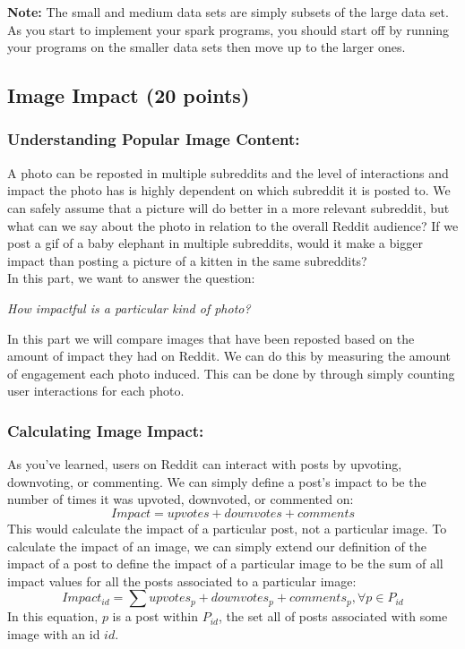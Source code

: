 \documentclass{article}
\begin{document}
\noindent \textbf{Note:}  The small and medium data sets are simply subsets of the large data set. As you start to implement your spark programs, you should start off by running your programs on the smaller data sets then move up to the larger ones. 


\subsection{Image Impact (20 points)}
\subsubsection*{Understanding Popular Image Content:}
A photo can be reposted in multiple subreddits and the level of interactions and impact the photo has is highly dependent on which subreddit it is posted to. We can safely assume that a picture will do better in a more relevant subreddit, but what can we say about the photo in relation to the overall Reddit audience? If we post a gif of a baby elephant in multiple subreddits, would it make a bigger impact than posting a picture of a kitten in the same subreddits? \\

\noindent In this part, we want to answer the question: 

\begin{center}
    \textit{How impactful is a particular kind of photo?}
\end{center}

\noindent In this part we will compare images that have been reposted based on the amount of impact they had on Reddit. We can do this by measuring the amount of engagement each photo induced. This can be done by through simply counting user interactions for each photo.

\subsubsection*{Calculating Image Impact:}
As you've learned, users on Reddit can interact with posts by upvoting, downvoting, or commenting. We can simply define a post's impact to be the number of times it was upvoted, downvoted, or commented on:
$$Impact = upvotes + downvotes + comments $$
This would calculate the impact of a particular post, not a particular image. To calculate the impact of an image, we can simply extend our definition of the impact of a post to define the impact of a particular image to be the sum of all impact values for all the posts associated to a particular image:
$$Impact_{id} = \sum upvotes_p + downvotes_p + comments_p, \forall p \in P_{id} $$
In this equation, $p$ is a post within $P_{id}$, the set all of posts associated with some image with an id $id$.
\end{document}
